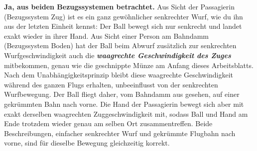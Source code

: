 \documentclass[addpoints,11pt,a4paper]{exam}
\begin{document}
\begin{theoriebox}
\textbf{Ja, aus beiden Bezugssystemen betrachtet.} Aus Sicht der
Passagierin (Bezugssystem Zug) ist es ein ganz gewöhnlicher senkrechter
Wurf, wie du ihn aus der letzten Einheit kennst: Der Ball bewegt sich nur
senkrecht und landet exakt wieder in ihrer Hand. Aus Sicht einer Person am
Bahndamm (Bezugssystem Boden) hat der Ball beim Abwurf zusätzlich zur
senkrechten Wurfgeschwindigkeit auch die \textbf{\emph{waagrechte
Geschwindigkeit des Zuges}} \glqq mitbekommen\grqq{}, genau wie die
geschnippte Münze am Anfang dieses Arbeitsblatts. Nach dem
Unabhängigkeitsprinzip bleibt diese waagrechte Geschwindigkeit während des
ganzen Flugs erhalten, unbeeinflusst von der senkrechten Wurfbewegung. Der
Ball fliegt daher, vom Bahndamm aus gesehen, auf einer gekrümmten Bahn nach
vorne. Die Hand der Passagierin bewegt sich aber mit exakt derselben
waagrechten Zuggeschwindigkeit mit, sodass Ball und Hand am Ende trotzdem
wieder genau am selben Ort zusammentreffen. Beide Beschreibungen, \glqq
einfacher senkrechter Wurf\grqq{} und \glqq gekrümmte Flugbahn nach
vorne\grqq{}, sind für dieselbe Bewegung gleichzeitig korrekt.
\end{theoriebox}
\end{document}
